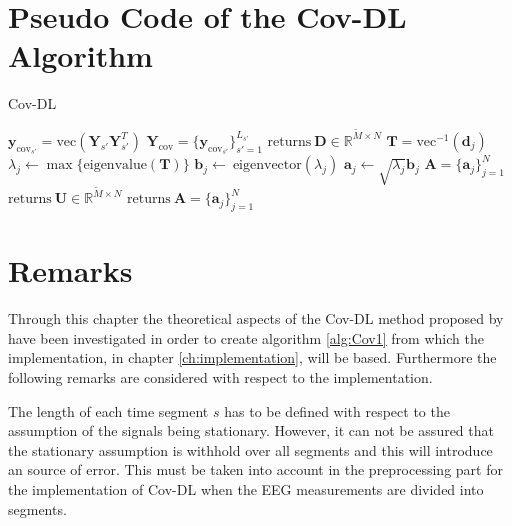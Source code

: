 


\section{Pseudo Code of the Cov-DL Algorithm}\label{seg:alg_cov}
\begin{algorithm}[H]
\caption{Cov-DL}
\begin{algorithmic}[1]
				\State$\textbf{y}_{\text{cov}_{s'}} = \text{vec}\left( \mathbf{Y}_{s'} \mathbf{Y}_{s'}^T \right)$	
			\EndFor			
			\State$\textbf{Y}_{\text{cov}} = \{\textbf{y}_{\text{cov}_{s'}}\}_{s'=1}^{L_{s'}}$
			\State
			\State$\text{returns} \ \textbf{D} \in \mathbb{R}^{\widetilde{M}\times N}$
			\EndProcedure
			\State$\textbf{T} = \text{vec}^{-1}(\textbf{d}_j)$            
			\State$\lambda_j\gets \max\{\text{eigenvalue}(\textbf{T})\}$
			\State$\textbf{b}_j \gets \ \text{eigenvector}(\lambda_j)$
			\State$\textbf{a}_j \gets \sqrt{\lambda_j}\textbf{b}_j$
			\EndFor
			\State$\textbf{A} = \{\textbf{a}_j\}_{j=1}^N$
			\EndIf
			\State
				\State$\text{returns} \ \textbf{U}\in \mathbb{R}^{\widetilde{M}\times N}$
				\EndProcedure
				\State$\text{returns}\ \textbf{A}= \{\textbf{a}_j\}_{j=1}^{N}$
				\EndProcedure
			\EndIf
           \EndProcedure
        \end{algorithmic} 
        \label{alg:Cov1}
\end{algorithm}

\section{Remarks}
Through this chapter the theoretical aspects of the Cov-DL method proposed by \cite{Balkan2015} have been investigated in order to create algorithm \ref{alg:Cov1} from which the implementation, in chapter \ref{ch:implementation}, will be based. Furthermore the following remarks are considered with respect to the implementation.   

The length of each time segment $s$ has to be defined with respect to the assumption of the signals being stationary. However, it can not be assured that the stationary assumption is withhold over all segments and this will introduce an source of error. 
This must be taken into account in the preprocessing part for the implementation of Cov-DL when the EEG measurements are divided into segments.

